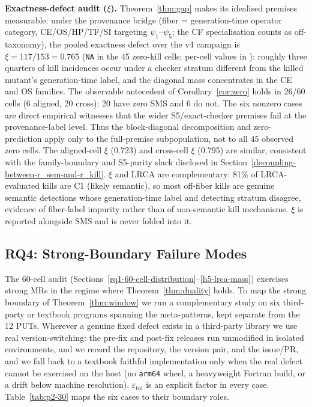 \documentclass[manuscript,screen,review]{acmart}
\begin{document}
\textbf{Exactness-defect audit ($\xi$).} Theorem~\ref{thm:gap} makes
its idealised premises measurable: under the provenance bridge (fiber =
generation-time operator category, CE/OS/HP/TF/SI targeting
$\psi_1$--$\psi_5$; the CF specialisation counts as off-taxonomy), the
pooled exactness defect over the v4 campaign is
$\xi = 117/153 = 0.765$ (\texttt{NA} in the 45 zero-kill cells;
per-cell values in ):
roughly three quarters of kill incidences occur under a checker stratum
different from the killed mutant's generation-time label, and the
diagonal mass concentrates in the CE and OS families. The observable
antecedent of Corollary~\ref{cor:zero} holds in 26/60
cells (6 aligned, 20 cross): 20 have zero SMS and 6 do not. The six
nonzero cases are direct empirical witnesses that the wider
S5/exact-checker premises fail at the provenance-label level. Thus the
block-diagonal decomposition and zero-prediction apply only to the
full-premise subpopulation, not to all 45 observed zero cells. The aligned-cell $\xi$
(0.723) and cross-cell $\xi$ (0.795) are similar, consistent with the
family-boundary and S5-purity slack disclosed in
Section~\ref{decoupling-between-r_sem-and-r_kill}. $\xi$ and LRCA are
complementary: 81\% of LRCA-evaluated kills are C1 (likely semantic),
so most off-fiber kills are genuine semantic detections whose
generation-time label and detecting stratum disagree, evidence of
fiber-label impurity rather than of non-semantic kill mechanisms. $\xi$
is reported alongside SMS and is never folded into it.

\subsection{RQ4: Strong-Boundary Failure Modes}\label{rq4-strong-boundary}

The 60-cell audit (Sections~\ref{rq1-60-cell-distribution}--\ref{h5-lrca-mass}) exercises strong MRs in the regime where
Theorem~\ref{thm:duality} holds. To map the strong boundary of Theorem~\ref{thm:window} we run a
complementary study on six third-party or textbook programs spanning the
meta-patterns, kept separate from the 12 PUTs. Wherever a genuine fixed
defect exists in a third-party library we use real version-switching:
the pre-fix and post-fix releases run unmodified in isolated environments,
and we record the repository, the version pair, and the issue/PR, and
we fall back to a textbook faithful implementation only when the real
defect cannot be exercised on the host (no \texttt{arm64} wheel, a
heavyweight Fortran build, or a drift below machine resolution).
$\varepsilon_{\mathrm{tol}}$ is an explicit factor in every case.
Table~\ref{tab:p2-30} maps the six cases to their boundary roles.
\end{document}
